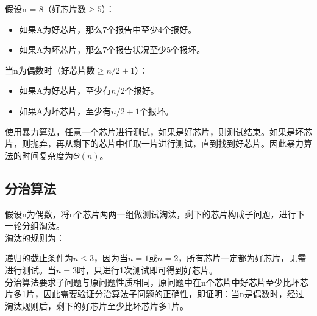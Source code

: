 假设n = 8（好芯片数$ \ge 5 $）：

\begin{itemize}
	\item 如果A为好芯片，那么7个报告中至少4个报好。
	\item 如果A为坏芯片，那么7个报告状况至少5个报坏。
\end{itemize}

当n为偶数时（好芯片数$ \ge n/2 + 1 $）：

\begin{itemize}
	\item 如果A为好芯片，至少有$ n / 2 $个报好。
	\item 如果A为坏芯片，至少有$ n/2 + 1 $个报坏。
\end{itemize}

使用暴力算法，任意一个芯片进行测试，如果是好芯片，则测试结束。如果是坏芯片，则抛弃，再从剩下的芯片中任取一片进行测试，直到找到好芯片。因此暴力算法的时间复杂度为$ \Theta(n) $。\\

\subsection{分治算法}

假设n为偶数，将n个芯片两两一组做测试淘汰，剩下的芯片构成子问题，进行下一轮分组淘汰。\\

淘汰的规则为：

\begin{table}[H]
	\centering
	\caption{淘汰规则}
\end{table}

递归的截止条件为$ n \le 3 $，因为当$ n = 1 $或$ n = 2 $，所有芯片一定都为好芯片，无需进行测试。当$ n = 3 $时，只进行1次测试即可得到好芯片。\\

分治算法要求子问题与原问题性质相同，原问题中在n个芯片中好芯片至少比坏芯片多1片，因此需要验证分治算法子问题的正确性，即证明：当n是偶数时，经过淘汰规则后，剩下的好芯片至少比坏芯片多1片。\\

